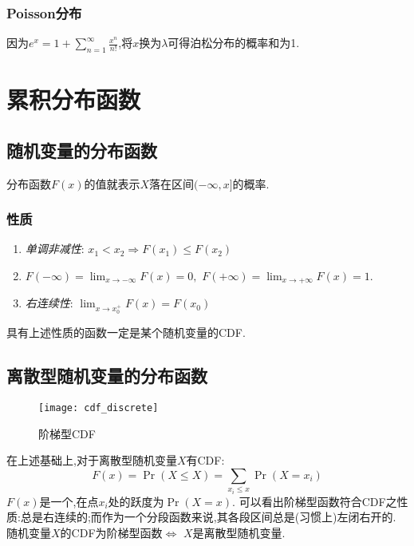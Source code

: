 \subsubsection{Poisson分布}
因为$e^x=1+\sum_{n=1}^{\infty}\frac{x^n}{n!}$,将$x$换为$\lambda$可得泊松分布的概率和为1.
\section{累积分布函数}
\subsection{随机变量的分布函数}
分布函数$F(x)$的值就表示$X$落在区间$(-\infty,x]$的概率.
\subsubsection{性质}
\begin{enumerate}
    \item \textit{单调非减性}: $x_1<x_2\Rightarrow F(x_1)\leq F(x_2)$
    \item $F(-\infty) = \lim_{x\rightarrow -\infty}F(x) = 0,\,\,F(+\infty) = \lim_{x\rightarrow +\infty}F(x) = 1$.
    \item \textit{右连续性}: $\lim_{x\rightarrow x_0^+}F(x) = F(x_0)$
\end{enumerate}
具有上述性质的函数一定是某个随机变量的CDF.
\newpage
\subsection{离散型随机变量的分布函数}
\begin{wrapfigure}[10]{r}{.3\textwidth}
    \centering
    \texttt{[image: cdf\_discrete]}
    \caption{阶梯型CDF}
\end{wrapfigure}
在上述基础上,对于离散型随机变量$X$有CDF:
\[F(x) = \Pr(X\leq X) = \sum_{x_i\leq x}\Pr(X=x_i)\]
$F(x)$是一个,在点$x_i$处的跃度为$\Pr(X=x)$.
可以看出阶梯型函数符合CDF之性质:总是右连续的;而作为一个分段函数来说,其各段区间总是(习惯上)左闭右开的.
随机变量$X$的CDF为阶梯型函数$\Leftrightarrow$ $X$是离散型随机变量.
